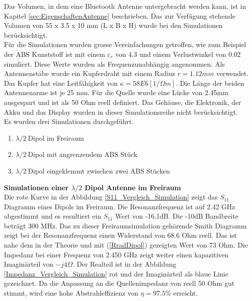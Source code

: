 Das Volumen, in dem eine Bluetooth Antenne untergebracht werden kann, ist in Kapitel \ref{sec:EigenschaftenAntenne} beschrieben. Das zur Verfügung stehende Volumen von 55 x 3.5 x 10 mm (L x B x H) wurde bei den Simulationen berücksichtigt. \\
Für die Simulationen wurden grosse Vereinfachungen getroffen, wie zum Beispiel der ABS Kunststoff ist mit einem $\varepsilon_r $ von 4.3 und einem Verlustwinkel von 0.02 simuliert. Diese Werte wurden als Frequenzunabhängig angenommen. Als Antennenstäbe wurde ein Kupferdraht mit einem Radius $r = 1.12 mm$ verwendet. Das Kupfer hat eine Leitfähigkeit von $\kappa=58E6 [1/\Omega m]$. Die Länge der beiden Antennenarme ist je 25 mm. Für die Quelle wurde eine Lücke von 2.45mm ausgespart und ist als 50 Ohm reell definiert. Das Gehäuse, die Elektronik, der Akku und das Display wurden in dieser Simulationsreihe nicht berücksichtigt.\\ 
Es wurden drei Simulationen durchgeführt.
\begin{enumerate}
\item $\lambda/2 \ $Dipol im Freiraum
\item $\lambda/2 \ $Dipol mit angrenzendem ABS Stück
\item $\lambda/2 \ $Dipol eingeklemmt zwischen zwei ABS Stücken
\end{enumerate}

\textbf{Simulationen einer $\lambda/2$ Dipol Antenne im Freiraum}\\
Die rote Kurve in der Abbildung \ref{S11_Vergleich_Simulation} zeigt das $S_{11}$ Diagramm eines Dipols im Freiraum. Die Resonanzfrequenz ist auf 2.42 GHz abgestimmt und es resultiert ein $S_{11}$ Wert von -16.1dB. Die -10dB Bandbreite beträgt 300 MHz. Das zu dieser Freiraumsimulation gehörende Smith Diagramm zeigt bei der Resonanzfrequenz einen Widerstand von 68.6 Ohm reell. Das ist nahe dem in der Theorie und mit (\ref{RradDipol}) gezeigten Wert von 73 Ohm. Die Impedanz bei einer Frequenz von 2.450 GHz zeigt weiter einen kapazitiven Imaginärteil von $-j4\Omega$. Der Realteil ist in der Abbildung \ref{Impedanz_Vergleich_Simulation} rot und der Imaginärteil als blaue Linie gezeichnet. Da die Anpassung an die Quellenimpedanz von reell 50 Ohm gut stimmt, wird eine hohe Abstrahleffizienz von $\eta = 97.5 \% $ erreicht.\\



